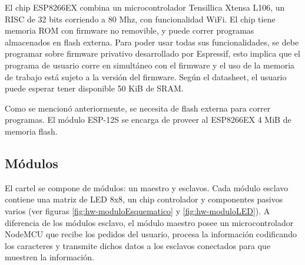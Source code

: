 El chip ESP8266EX combina un microcontrolador Tensillica Xtensa L106, un RISC de 32 bits corriendo a 80 Mhz, con funcionalidad WiFi. \cite{ESP8266Datasheet} El chip tiene memoria ROM con firmware no removible, y puede correr programas almacenados en flash externa. Para poder usar todas sus funcionalidades, se debe programar sobre firmware privativo desarrollado por Espressif, esto implica que el programa de usuario corre en simultáneo con el firmware y el uso de la memoria de trabajo está sujeto a la versión del firmware. Según el datasheet, el usuario puede esperar tener disponible 50 KiB de SRAM.

Como se mencionó anteriormente, se necesita de flash externa para correr programas. El módulo ESP-12S se encarga de proveer al ESP8266EX 4 MiB de memoria flash.

\subsection{Módulos}
El cartel se compone de módulos: un maestro y esclavos. Cada módulo esclavo contiene una matriz de LED 8x8, un chip controlador \cite{MAX7219} y componentes pasivos varios (ver figuras \ref{fig:hw-moduloEsquematico} y \ref{fig:hw-moduloLED}). A diferencia de los módulos esclavo, el módulo maestro posee un microcontrolador NodeMCU que recibe los pedidos del usuario, procesa la información codificando los caracteres y transmite dichos datos a los esclavos conectados para que muestren la información.

